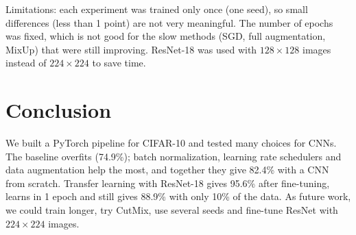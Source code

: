 \documentclass[conference]{IEEEtran}
\begin{document}
Limitations: each experiment was trained only once (one seed), so small differences (less than 1 point) are not very
meaningful. The number of epochs was fixed, which is not good for the slow methods (SGD, full augmentation, MixUp)
that were still improving. ResNet-18 was used with $128\times128$ images instead of $224\times224$ to save time.

\section{Conclusion}
We built a PyTorch pipeline for CIFAR-10 and tested many choices for CNNs. The baseline overfits (74.9\%); batch
normalization, learning rate schedulers and data augmentation help the most, and together they give 82.4\% with a CNN
from scratch. Transfer learning with ResNet-18 gives 95.6\% after fine-tuning, learns in 1 epoch and still gives
88.9\% with only 10\% of the data. As future work, we could train longer, try CutMix, use several seeds and fine-tune
ResNet with $224\times224$ images.
\end{document}
